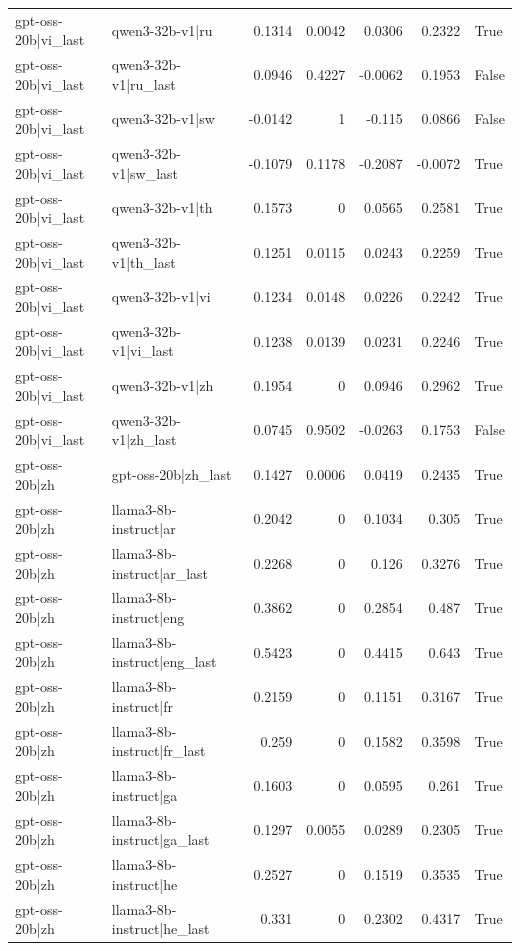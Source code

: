 \begin{table}
\begin{tabular}{l l r r r r l}
gpt-oss-20b|vi_last & qwen3-32b-v1|ru & 0.1314 & 0.0042 & 0.0306 & 0.2322 & True \\
gpt-oss-20b|vi_last & qwen3-32b-v1|ru_last & 0.0946 & 0.4227 & -0.0062 & 0.1953 & False \\
gpt-oss-20b|vi_last & qwen3-32b-v1|sw & -0.0142 & 1 & -0.115 & 0.0866 & False \\
gpt-oss-20b|vi_last & qwen3-32b-v1|sw_last & -0.1079 & 0.1178 & -0.2087 & -0.0072 & True \\
gpt-oss-20b|vi_last & qwen3-32b-v1|th & 0.1573 & 0 & 0.0565 & 0.2581 & True \\
gpt-oss-20b|vi_last & qwen3-32b-v1|th_last & 0.1251 & 0.0115 & 0.0243 & 0.2259 & True \\
gpt-oss-20b|vi_last & qwen3-32b-v1|vi & 0.1234 & 0.0148 & 0.0226 & 0.2242 & True \\
gpt-oss-20b|vi_last & qwen3-32b-v1|vi_last & 0.1238 & 0.0139 & 0.0231 & 0.2246 & True \\
gpt-oss-20b|vi_last & qwen3-32b-v1|zh & 0.1954 & 0 & 0.0946 & 0.2962 & True \\
gpt-oss-20b|vi_last & qwen3-32b-v1|zh_last & 0.0745 & 0.9502 & -0.0263 & 0.1753 & False \\
gpt-oss-20b|zh & gpt-oss-20b|zh_last & 0.1427 & 0.0006 & 0.0419 & 0.2435 & True \\
gpt-oss-20b|zh & llama3-8b-instruct|ar & 0.2042 & 0 & 0.1034 & 0.305 & True \\
gpt-oss-20b|zh & llama3-8b-instruct|ar_last & 0.2268 & 0 & 0.126 & 0.3276 & True \\
gpt-oss-20b|zh & llama3-8b-instruct|eng & 0.3862 & 0 & 0.2854 & 0.487 & True \\
gpt-oss-20b|zh & llama3-8b-instruct|eng_last & 0.5423 & 0 & 0.4415 & 0.643 & True \\
gpt-oss-20b|zh & llama3-8b-instruct|fr & 0.2159 & 0 & 0.1151 & 0.3167 & True \\
gpt-oss-20b|zh & llama3-8b-instruct|fr_last & 0.259 & 0 & 0.1582 & 0.3598 & True \\
gpt-oss-20b|zh & llama3-8b-instruct|ga & 0.1603 & 0 & 0.0595 & 0.261 & True \\
gpt-oss-20b|zh & llama3-8b-instruct|ga_last & 0.1297 & 0.0055 & 0.0289 & 0.2305 & True \\
gpt-oss-20b|zh & llama3-8b-instruct|he & 0.2527 & 0 & 0.1519 & 0.3535 & True \\
gpt-oss-20b|zh & llama3-8b-instruct|he_last & 0.331 & 0 & 0.2302 & 0.4317 & True \\

\end{tabular}
\end{table}
